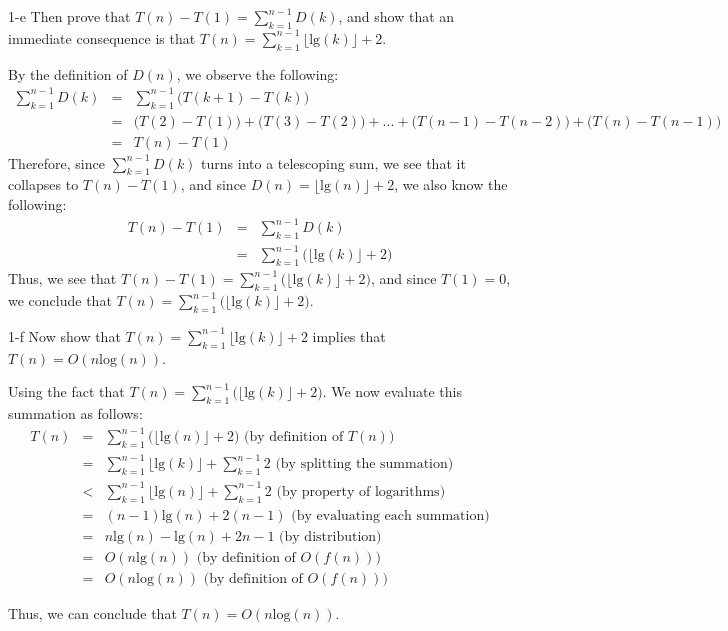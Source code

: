 \documentclass[11pt]{article}
\newcommand{\tlg}{\text{lg}}
\newcommand{\tlog}{\text{log}}
\begin{document}
\begin{prob}{1-e}
Then prove that $T(n) - T(1) = \sum_{k=1}^{n-1} D(k)$, and show that an immediate consequence is that $T(n) = \sum_{k=1}^{n-1}\lfloor \tlg(k) \rfloor + 2$.
\end{prob}
\begin{sol}
By the definition of $D(n)$, we observe the following:
\begin{eqnarray*}
\sum_{k=1}^{n-1}D(k) & = & \sum_{k=1}^{n-1}\Big(T(k + 1) - T(k)\Big) \\
& = & \big(T(2) - T(1)\big) + \big(T(3) - T(2)\big) + ... + \big(T(n-1) - T(n-2)\big) + \big(T(n) - T(n-1)\big) \\
& = & T(n) - T(1) 
\end{eqnarray*}
Therefore, since $\sum_{k=1}^{n-1}D(k)$ turns into a telescoping sum, we see that it collapses to $T(n) - T(1)$, and since $D(n) = \lfloor\tlg(n)\rfloor + 2$, we also know the following:
\begin{eqnarray*}
T(n) - T(1) & = & \sum_{k=1}^{n-1}D(k) \\
& = & \sum_{k=1}^{n-1}\big(\lfloor\tlg(k)\rfloor + 2\big)
\end{eqnarray*}
Thus, we see that $T(n) - T(1) = \sum_{k=1}^{n-1}\big(\lfloor\tlg(k)\rfloor + 2\big)$, and since $T(1) = 0$, we conclude that $T(n) = \sum_{k=1}^{n-1}\big(\lfloor\tlg(k)\rfloor + 2\big)$.
\end{sol}

\begin{prob}{1-f}
Now show that $T(n) = \sum_{k=1}^{n-1}\lfloor \tlg(k) \rfloor + 2$ implies that $T(n) = O(n\tlog(n))$.
\end{prob}
\begin{sol}
Using the fact that $T(n) = \sum_{k=1}^{n-1}\big(\Big\lfloor\tlg(k)\Big\rfloor + 2\big)$. We now evaluate this summation as follows:
\begin{eqnarray*}
T(n) & = & \sum_{k=1}^{n-1}\big(\lfloor\tlg(n)\rfloor + 2\big) \text{ (by definition of $T(n)$)}\\ 
& = & \sum_{k=1}^{n-1}\lfloor\tlg(k)\rfloor + \sum_{k=1}^{n-1}2 \text{ (by splitting the summation)}\\
& < & \sum_{k=1}^{n-1}\lfloor\tlg(n)\rfloor + \sum_{k=1}^{n-1}2 \text{ (by property of logarithms)}\\
& = & (n-1)\tlg(n) + 2(n-1) \text{ (by evaluating each summation)}\\
& = & n\tlg(n) - \tlg(n) + 2n - 1 \text{ (by distribution)}\\
& = & O(n\tlg(n)) \text{ (by definition of $O(f(n))$)}\\
& = & O(n\tlog(n)) \text{ (by definition of $O(f(n))$)}
\end{eqnarray*}

Thus, we can conclude that $T(n) = O(n\tlog(n))$.
\end{sol}
\end{document}
